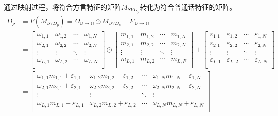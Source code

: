 \documentclass[lang=cn,cite=super]{elegantpaper}
\begin{document}
通过映射过程，将符合方言特征的矩阵$M_{SVD_p}$转化为符合普通话特征的矩阵。
\begin{equation}
\begin{aligned}
    D_p &= F(M_{SVD_p}) = \Omega_{\mathbb{D}\rightarrow  \mathbb{M}} \odot M_{SVD_p} + E_{\mathbb{D}\rightarrow \mathbb{M}} \\
    &= \begin{bmatrix}
        \omega_{1,1} & \omega_{1,2} & \cdots & \omega_{1,N} \\
        \omega_{2,1} & \omega_{2,2} & \cdots & \omega_{2,N} \\
        \vdots & \vdots & \ddots & \vdots \\
        \omega_{L,1} & \omega_{L,2} & \cdots & \omega_{L,N}\\
    \end{bmatrix} \odot \begin{bmatrix}
        m_{1,1} & m_{1,2} & \cdots & m_{1,N} \\
        m_{2,1} & m_{2,2} & \cdots & m_{2,N} \\
        \vdots & \vdots & \ddots & \vdots \\
        m_{L,1} & m_{L,2} & \cdots & m_{L,N}\\
    \end{bmatrix} + \begin{bmatrix}
        \varepsilon_{1,1} & \varepsilon_{1,2} & \cdots & \varepsilon_{1,N} \\
        \varepsilon_{2,1} & \varepsilon_{2,2} & \cdots & \varepsilon_{2,N} \\
        \vdots & \vdots & \ddots & \vdots \\
        \varepsilon_{L,1} & \varepsilon_{L,2} & \cdots & \varepsilon_{L,N}\\
    \end{bmatrix}\\
    &= \begin{bmatrix}
        \omega_{1,1}m_{1,1}+\varepsilon_{1,1} & \omega_{1,2}m_{1,2}+\varepsilon_{1,2} & \cdots & \omega_{1,N}m_{1,N}+\varepsilon_{1,N} \\
        \omega_{2,1}m_{2,1}+\varepsilon_{2,1} & \omega_{2,2}m_{2,2}+\varepsilon_{2,2} & \cdots & \omega_{2,N}m_{2,N}+\varepsilon_{2,N} \\
        \vdots & \vdots & \ddots & \vdots \\
        \omega_{L,1}m_{L,1}+\varepsilon_{L,1} & \omega_{L,2}m_{L,2}+\varepsilon_{L,2} & \cdots & \omega_{L,N}m_{L,N}+\varepsilon_{L,N}\\
    \end{bmatrix}
\end{aligned}
\end{equation}
\end{document}
